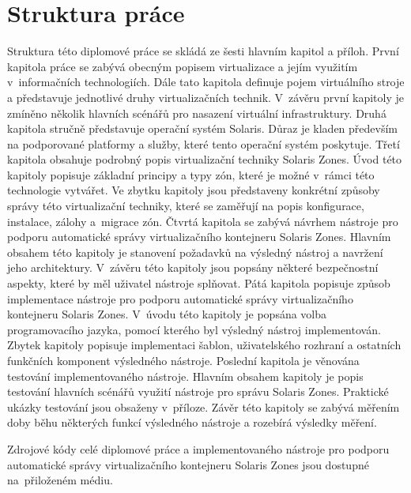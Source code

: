 \section{Struktura práce}
\label{chapter:introduction:structure}
Struktura této diplomové práce se skládá ze šesti hlavním kapitol a příloh. První kapitola práce se zabývá obecným popisem virtualizace
a jejím využitím v~informačních technologiích. Dále tato kapitola definuje pojem virtuálního stroje a představuje jednotlivé druhy
virtualizačních technik. V~závěru první kapitoly je zmíněno několik hlavních scénářů pro nasazení virtuální infrastruktury. Druhá kapitola
stručně představuje operační systém Solaris. Důraz je kladen především na podporované platformy a služby, které
tento operační systém poskytuje. Třetí kapitola obsahuje podrobný popis virtualizační techniky Solaris Zones. Úvod této kapitoly
popisuje základní principy a typy zón, které je možné v~rámci této technologie vytvářet. Ve zbytku kapitoly jsou představeny
konkrétní způsoby správy této virtualizační techniky, které se zaměřují na popis konfigurace, instalace, zálohy a~migrace zón. 
Čtvrtá kapitola se zabývá návrhem nástroje pro podporu automatické správy virtualizačního kontejneru Solaris Zones. Hlavním obsahem
této kapitoly je stanovení požadavků na výsledný nástroj a navržení jeho architektury. V~závěru této kapitoly jsou popsány některé
bezpečnostní aspekty, které by měl uživatel nástroje splňovat. Pátá kapitola popisuje způsob implementace nástroje pro podporu automatické
správy virtualizačního kontejneru Solaris Zones. V~úvodu této kapitoly je popsána volba programovacího jazyka, pomocí kterého byl výsledný
nástroj implementován. Zbytek kapitoly popisuje implementaci šablon, uživatelského rozhraní a ostatních funkčních komponent výsledného
nástroje. Poslední kapitola je věnována testování implementovaného nástroje. Hlavním obsahem kapitoly je popis testování hlavních
scénářů využití nástroje pro správu Solaris Zones. Praktické ukázky testování jsou obsaženy v~příloze. Závěr této kapitoly se zabývá měřením
doby běhu některých funkcí výsledného nástroje a rozebírá výsledky měření. 

Zdrojové kódy celé diplomové práce a implementovaného nástroje pro podporu automatické správy virtualizačního kontejneru Solaris Zones
jsou dostupné na~přiloženém médiu.




